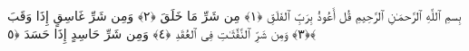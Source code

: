 
  
    
  
    
    

\nopagebreak
  بِسمِ ٱللَّهِ ٱلرَّحمَـٰنِ ٱلرَّحِيمِ
     قُل أَعُوذُ بِرَبِّ ٱلفَلَقِ ﴿١﴾
 مِن شَرِّ مَا خَلَقَ ﴿٢﴾
 وَمِن شَرِّ غَاسِقٍ إِذَا وَقَبَ ﴿٣﴾
 وَمِن شَرِّ ٱلنَّفَّٰثَـٰتِ فِى ٱلعُقَدِ ﴿٤﴾
 وَمِن شَرِّ حَاسِدٍ إِذَا حَسَدَ ﴿٥﴾
 
